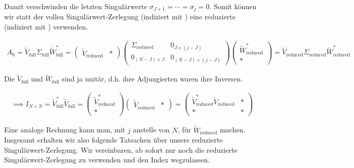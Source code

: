 Damit verschwinden die letzten Singulärwerte $\sigma_{J+1} = \cdots = \sigma_j = 0$.
Somit können wir statt der vollen Singulärwert-Zerlegung (indiziert mit ) eine reduzierte (indiziert mit ) verwenden.

\begin{align*}
    A_0
    =
    \tilde V_\mathrm{full} \Sigma_\mathrm{full} \tilde W_\mathrm{full}^\ast
    =
    \begin{pmatrix}
        \tilde V_\mathrm{reduced} & \ast
    \end{pmatrix}
    \begin{pmatrix}
        \Sigma_\mathrm{reduced} & 0_{J \times (j - J)}       \\
        0_{(N - J) \times J}    & 0_{(N - J) \times (j - J)}
    \end{pmatrix}
    \begin{pmatrix}
        \tilde W_\mathrm{reduced}^\ast \\ \ast
    \end{pmatrix}
    =
    \tilde V_\mathrm{reduced} \Sigma_\mathrm{reduced} \tilde W_\mathrm{reduced}^\ast
\end{align*}

Die $\tilde V_\mathrm{full}$ und $\tilde W_\mathrm{full}$ sind ja unitär, d.h. ihre Adjungierten waren ihre Inversen.

\begin{align*}
    \implies
    I_{N \times N}
    =
    \tilde V_\mathrm{full}^\ast \tilde V_\mathrm{full}
    =
    \begin{pmatrix}
        \tilde V_\mathrm{reduced}^\ast \\ \ast
    \end{pmatrix}
    \begin{pmatrix}
        \tilde V_\mathrm{reduced} & \ast
    \end{pmatrix}
    =
    \begin{pmatrix}
        \tilde V_\mathrm{reduced}^\ast \tilde V_\mathrm{reduced} & \ast \\
        \ast                                                     & \ast
    \end{pmatrix}
\end{align*}

Eine analoge Rechnung kann man, mit $j$ anstelle von $N$, für $\tilde W_\mathrm{reduced}$ machen.
Insgesamt erhalten wir also folgende Tatsachen über unsere reduzierte Singulärwert-Zerlegung.
Wir vereinbaren, ab sofort nur noch die reduzierte Singulärwert-Zerlegung zu verwenden und den Index wegzulassen.

